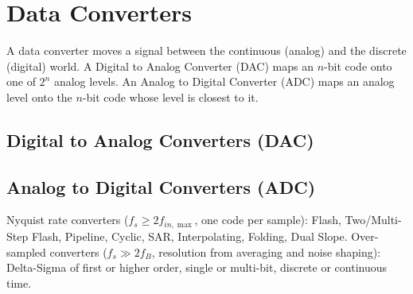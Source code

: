 \chapter{Data Converters}\label{ch:data_converters}

A data converter moves a signal between the continuous (analog) and the
discrete (digital) world. A Digital to Analog Converter (DAC) maps an
\(n\)-bit code onto one of \(2^n\) analog levels. An Analog to Digital
Converter (ADC) maps an analog level onto the \(n\)-bit code whose level
is closest to it.




\section{Digital to Analog Converters (DAC)}\label{sec:dac}






\section{Analog to Digital Converters (ADC)}\label{sec:adc}
Nyquist rate converters (\(f_s \geq 2 f_{in,\max}\), one code per sample):
Flash, Two/Multi-Step Flash, Pipeline, Cyclic, SAR, Interpolating,
Folding, Dual Slope. Over-sampled converters (\(f_s \gg 2 f_B\), resolution
from averaging and noise shaping): Delta-Sigma of first or higher order,
single or multi-bit, discrete or continuous time.








